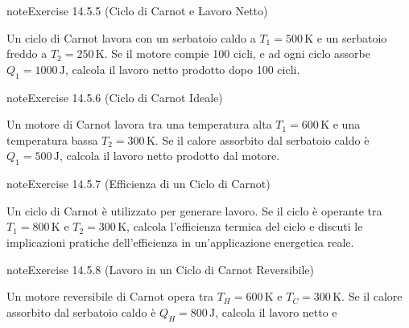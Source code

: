 \documentclass[letterpaper,10pt,italian]{jupyterBook}
\begin{document}
\begin{sphinxadmonition}{note}{Exercise 14.5.5 (Ciclo di Carnot e Lavoro Netto)}



\sphinxAtStartPar
Un ciclo di Carnot lavora con un serbatoio caldo a \(T_1 = 500 \, \text{K}\) e un serbatoio freddo a \(T_2 = 250 \, \text{K}\). Se il motore compie 100 cicli, e ad ogni ciclo assorbe \(Q_1 = 1000 \, \text{J}\), calcola il lavoro netto prodotto dopo 100 cicli.
\end{sphinxadmonition}
 \label{exercise:ch/thermodynamics/heat-engine-problems-exercise-5}

\begin{sphinxadmonition}{note}{Exercise 14.5.6 (Ciclo di Carnot Ideale)}



\sphinxAtStartPar
Un motore di Carnot lavora tra una temperatura alta \(T_1 = 600 \, \text{K}\) e una temperatura bassa \(T_2 = 300 \, \text{K}\). Se il calore assorbito dal serbatoio caldo è \(Q_1 = 500 \, \text{J}\), calcola il lavoro netto prodotto dal motore.
\end{sphinxadmonition}
 \label{exercise:ch/thermodynamics/heat-engine-problems-exercise-6}

\begin{sphinxadmonition}{note}{Exercise 14.5.7 (Efficienza di un Ciclo di Carnot)}



\sphinxAtStartPar
Un ciclo di Carnot è utilizzato per generare lavoro. Se il ciclo è operante tra \(T_1 = 800 \, \text{K}\) e \(T_2 = 300 \, \text{K}\), calcola l’efficienza termica del ciclo e discuti le implicazioni pratiche dell’efficienza in un’applicazione energetica reale.
\end{sphinxadmonition}
 \label{exercise:ch/thermodynamics/heat-engine-problems-exercise-7}

\begin{sphinxadmonition}{note}{Exercise 14.5.8 (Lavoro in un Ciclo di Carnot Reversibile)}



\sphinxAtStartPar
Un motore reversibile di Carnot opera tra \(T_H = 600 \, \text{K}\) e \(T_C = 300 \, \text{K}\). Se il calore assorbito dal serbatoio caldo è \(Q_H = 800 \, \text{J}\), calcola il lavoro netto e
\end{sphinxadmonition}
 \label{exercise:ch/thermodynamics/heat-engine-problems-exercise-8}
\end{document}
